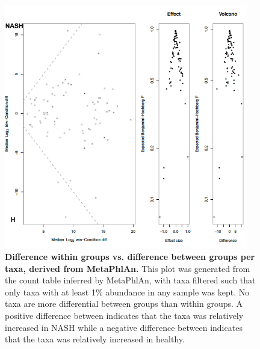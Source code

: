 \begin{figure}[h]
\begin{center}
\includegraphics[width=0.95\textwidth]{metaphlan_aldex.png}
\caption{\textbf{Difference within groups vs. difference between groups per taxa, derived from MetaPhlAn.} This plot was generated from the count table inferred by MetaPhlAn, with taxa filtered such that only taxa with at least 1\% abundance in any sample was kept. No taxa are more differential between groups than within groups. A positive difference between indicates that the taxa was relatively increased in NASH while a negative difference between indicates that the taxa was relatively increased in healthy.}
\end{center}
\label{nafld_metaphlan_aldex}
\end{figure}

